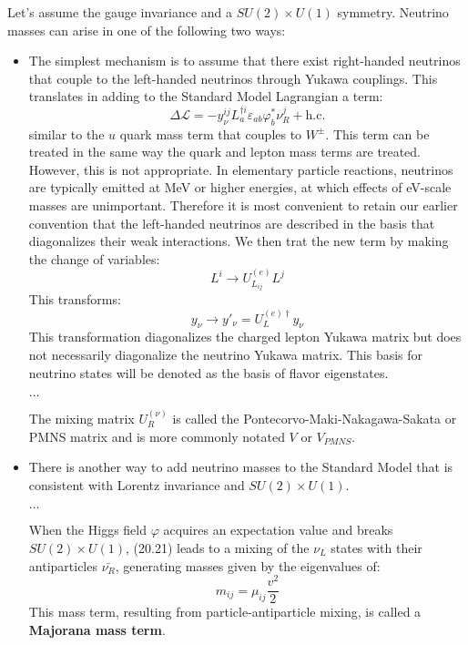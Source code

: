 \documentclass[../../main/main.tex]{subfiles}
\begin{document}
Let's assume the gauge invariance and a \( SU(2) \times U(1) \) symmetry. Neutrino masses can arise in one of the following two ways:
\begin{itemize}
	\item The simplest mechanism is to assume that there exist right-handed neutrinos that couple to the left-handed neutrinos through Yukawa couplings. This translates in adding to the Standard Model Lagrangian a term:
	\begin{equation}
		\Delta \mathcal{L}
		=
		- y^{ij}_{\nu} L^{\dag i}_a \varepsilon_{ab} \varphi^*_b \nu^j_R
		+ \text{h.c.}
		\label{eq:}
	\end{equation}
	similar to the \( u \) quark mass term that couples to \( W^{\pm} \). This term can be treated in the same way the quark and lepton mass terms are treated. However, this is not appropriate. In elementary particle reactions, neutrinos are typically emitted at MeV or higher energies, at which effects of eV-scale masses are unimportant. Therefore it is most convenient to retain our earlier convention that the left-handed neutrinos are described in the basis that diagonalizes their weak interactions. We then trat the new term by making the change of variables:
	\begin{equation}
		L^i \longrightarrow U^{(e)}_{L_{ij}} L^j
		\label{eq:}
	\end{equation}
	This transforms:
	\begin{equation}
		y_{\nu} \longrightarrow y'_{\nu} = U^{(e)\dag}_L y_{\nu}
		\label{eq:}
	\end{equation}
	This transformation diagonalizes the charged lepton Yukawa matrix but does not necessarily diagonalize the neutrino Yukawa matrix. This basis for neutrino states will be denoted as the basis of flavor eigenstates.

	\( \dots  \)

	The mixing matrix \( U^{(\nu)}_R \) is called the Pontecorvo-Maki-Nakagawa-Sakata or PMNS matrix and is more commonly notated \( V \) or \( V_{PMNS} \).

	\item There is another way to add neutrino masses to the Standard Model that is consistent with Lorentz invariance and \( SU(2) \times U(1) \).

	\( \dots  \)

	When the Higgs field \( \varphi \) acquires an expectation value and breaks \( SU(2) \times U(1) \), (20.21) leads to a mixing of the \( \nu_L \) states with their antiparticles \( \bar{\nu_R} \), generating masses given by the eigenvalues of:
	\begin{equation}
		m_{ij}
		=
		\mu_{ij} \frac{v^2}{2}
		\label{eq:}
	\end{equation}
	This mass term, resulting from particle-antiparticle mixing, is called a \textbf{Majorana mass term}.


\end{itemize}
\end{document}

